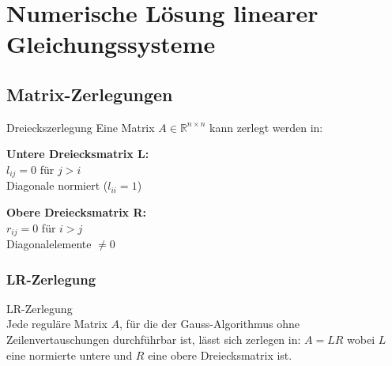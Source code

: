 

\section{Numerische Lösung linearer Gleichungssysteme}

\subsection{Matrix-Zerlegungen}

\begin{definition}{Dreieckszerlegung}
Eine Matrix $A \in \mathbb{R}^{n\times n}$ kann zerlegt werden in:
\vspace{1mm}\\
\begin{minipage}[t]{0.5\textwidth}
    \textbf{Untere Dreiecksmatrix L:}\\
    $l_{ij} = 0$ für $j > i$\\
    Diagonale normiert ($l_{ii}=1$)
\end{minipage}
\hspace{3mm}
\begin{minipage}[t]{0.45\textwidth}
    \textbf{Obere Dreiecksmatrix R:}\\
    $r_{ij} = 0$ für $i > j$\\
    Diagonalelemente $\neq 0$
\end{minipage}
\end{definition}


\subsubsection{LR-Zerlegung}

\begin{theorem}{LR-Zerlegung}\\
Jede reguläre Matrix $A$, für die der Gauss-Algorithmus ohne Zeilenvertauschungen durchführbar ist, lässt sich zerlegen in:
$A = LR$
wobei $L$ eine normierte untere und $R$ eine obere Dreiecksmatrix ist.
\end{theorem}

